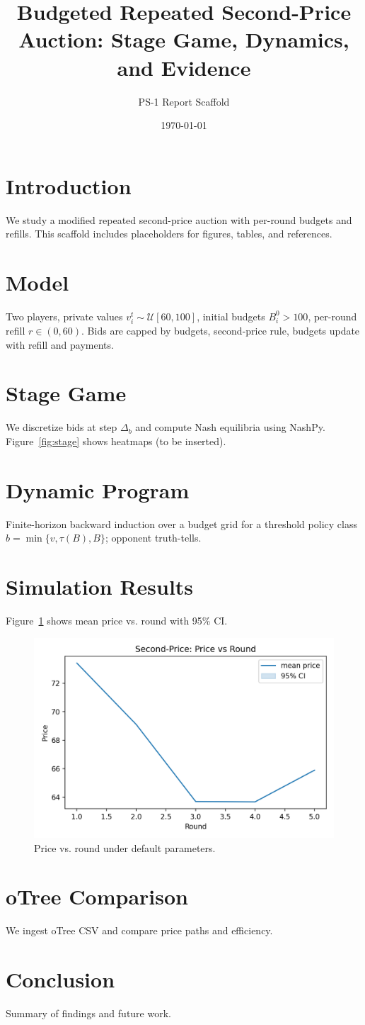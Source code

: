 \documentclass[11pt]{article}
\title{Budgeted Repeated Second-Price Auction: Stage Game, Dynamics, and Evidence}
\author{PS-1 Report Scaffold}
\date{\today}
\begin{document}
\maketitle

\section{Introduction}
We study a modified repeated second-price auction with per-round budgets and refills.
This scaffold includes placeholders for figures, tables, and references.

\section{Model}
Two players, private values $v_i^t \sim \mathcal{U}[60,100]$, initial budgets $B_i^0>100$, per-round refill $r\in(0,60)$. Bids are capped by budgets, second-price rule, budgets update with refill and payments.

\section{Stage Game}
We discretize bids at step $\Delta_b$ and compute Nash equilibria using NashPy.
Figure~\ref{fig:stage} shows heatmaps (to be inserted).

\section{Dynamic Program}
Finite-horizon backward induction over a budget grid for a threshold policy class $b=\min\{v,\tau(B),B\}$; opponent truth-tells.

\section{Simulation Results}
Figure~\ref{fig:pricepath} shows mean price vs. round with 95\% CI.
\begin{figure}[h]
  \centering
  \includegraphics[width=0.7\linewidth]{figures/price_vs_round.png}
  \caption{Price vs. round under default parameters.}
  \label{fig:pricepath}
\end{figure}

\section{oTree Comparison}
We ingest oTree CSV and compare price paths and efficiency.

\section{Conclusion}
Summary of findings and future work.

% 
% 
\end{document}
